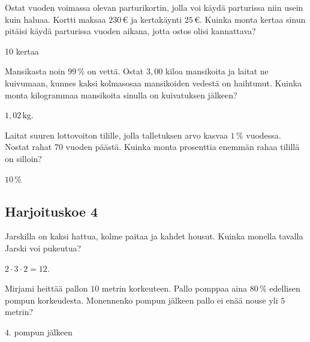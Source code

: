 	\begin{tehtava}
Ostat vuoden voimassa olevan parturikortin, jolla voi käydä parturissa niin usein kuin haluaa. Kortti maksaa $230$\,€ ja kertakäynti $25$\,€. Kuinka monta kertaa sinun pitäisi käydä parturissa vuoden aikana, jotta ostos olisi kannattava?
	\begin{vastaus}
	 10 kertaa
	\end{vastaus}
	\end{tehtava}
	

	\begin{tehtava}
Mansikasta noin $99\,\%$ on vettä. Ostat $3,00$ kiloa mansikoita ja laitat ne kuivumaan, kunnes kaksi kolmasosaa mansikoiden vedestä on haihtunut. Kuinka monta kilogrammaa mansikoita sinulla on kuivatuksen jälkeen?
	\begin{vastaus}
	 $1,02$\,kg.
	\end{vastaus}
	\end{tehtava}
	
	\begin{tehtava}
Laitat suuren lottovoiton tilille, jolla talletuksen arvo kasvaa $1\,\%$ vuodessa. Nostat rahat $70$ vuoden päästä. Kuinka monta prosenttia enemmän rahaa tilillä on silloin?
	\begin{vastaus}
	 $10$\,\%
	\end{vastaus}
	\end{tehtava}
	
\subsection*{Harjoituskoe 4}
	
	\begin{tehtava}
Jarskilla on kaksi hattua, kolme paitaa ja kahdet housut. Kuinka monella tavalla Jarski voi pukeutua?
	 \begin{vastaus}
	  $2 \cdot 3 \cdot 2 = 12$.
	 \end{vastaus}
	 \end{tehtava}
	 
	\begin{tehtava}
Mirjami heittää pallon $10$ metrin korkeuteen. Pallo pomppaa aina $80$\,\% edellisen pompun korkeudesta. Monennenko pompun jälkeen pallo ei enää nouse yli $5$ metrin?
	\begin{vastaus}
	 $4$. pompun jälkeen
	\end{vastaus}
	\end{tehtava}
	
